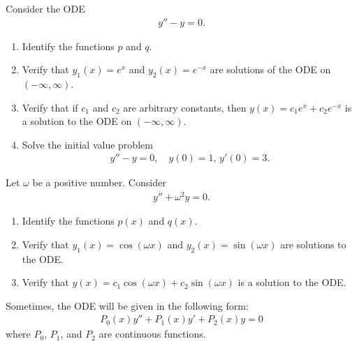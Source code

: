 \documentclass[12pt,a4paper]{article}
\newcounter{example}[section]
\begin{document}
\begin{example}\label{Examp:FirstOne}
Consider the ODE
	\begin{align*}
	y'' - y = 0 .
	\end{align*}
\begin{enumerate}[label=\alph*)]
\item Identify the functions $p$ and $q$.
\item Verify that $y_1 (x) = e^x$ and $y_2 (x) = e^{-x}$ are solutions of the ODE on $(-\infty , \infty )$.
\item Verify that if $c_1$ and $c_2$ are arbitrary constants, then $y (x) = c_1 e^{x} + c_2 e^{-x}$ is a solution to the ODE on $(-\infty , \infty )$.
\item Solve the initial value problem
	\begin{align*}
	y'' - y = 0 , \quad y(0) = 1 , \, y' (0) = 3 .
	\end{align*}
\end{enumerate}
\end{example}

\newpage

\phantom{1}

\newpage

\begin{example}\label{Examp:SecondOne}
Let $\omega$ be a positive number. Consider
	\begin{align*}
	y'' + \omega^2 y = 0 .
	\end{align*}
\begin{enumerate}[label=\alph*)]
\item Identify the functions $p(x)$ and $q(x)$.
\item Verify that $y_1 (x) = \cos (\omega x )$ and $y_2 (x) = \sin (\omega x)$ are solutions to the ODE.
\item Verify that $y(x) = c_1 \cos (\omega x ) + c_2 \sin (\omega x)$ is a solution to the ODE.
\end{enumerate}
\end{example}

\newpage

Sometimes, the ODE will be given in the following form:
	\begin{align*}
	P_0 (x) y'' + P_1 (x) y' + P_2 (x) y = 0
	\end{align*}
where $P_0$, $P_1$, and $P_2$ are continuous functions. 

\vspace*{16pt}
\end{document}
